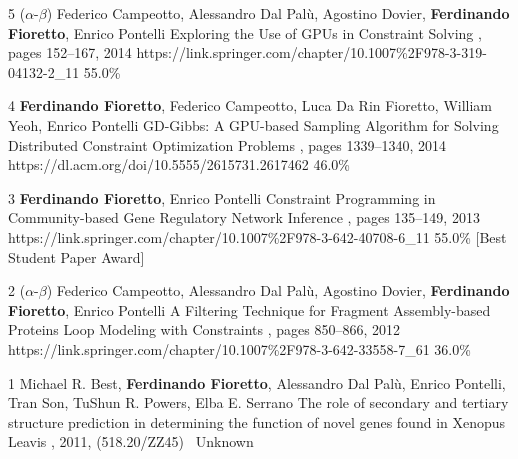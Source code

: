 \begin{pubs}
	\confentry
		{5} %
		{($\alpha$-$\beta$) 
		Federico Campeotto, Alessandro Dal Pal\`{u}, Agostino Dovier, {\bf Ferdinando Fioretto}, Enrico Pontelli}
		{Exploring the Use of GPUs in Constraint Solving}
		{\procPADL, pages 152--167, 2014}
		{https://link.springer.com/chapter/10.1007\%2F978-3-319-04132-2\_11}
		{55.0\%}

	\confentry 
		{4} %
		{{\bf Ferdinando Fioretto}, Federico Campeotto, Luca Da Rin Fioretto, William Yeoh, Enrico Pontelli} 
		{GD-Gibbs: A GPU-based Sampling Algorithm for Solving Distributed Constraint Optimization Problems} %
		{\procAAMAS, pages 1339--1340, 2014}
		{https://dl.acm.org/doi/10.5555/2615731.2617462}
		{46.0\%}

	\confentryAwd
		{3} %
		{{\bf Ferdinando Fioretto}, Enrico Pontelli} 
		{Constraint Programming in Community-based Gene Regulatory Network Inference} 
		{\procCMSB, pages 135--149, 2013}
		{https://link.springer.com/chapter/10.1007\%2F978-3-642-40708-6\_11}
		{55.0\%}
		{[Best Student Paper Award]}{}

	\confentry 
		{2} %
		{($\alpha$-$\beta$) 
		Federico Campeotto, Alessandro Dal Pal\`{u}, Agostino Dovier, {\bf Ferdinando Fioretto}, Enrico Pontelli}
		{A Filtering Technique for Fragment Assembly-based Proteins Loop Modeling with Constraints} 
		{\procCP, pages 850--866, 2012}
		{https://link.springer.com/chapter/10.1007\%2F978-3-642-33558-7\_61}
		{36.0\%}

	\confentry
		{1} %
		{Michael R. Best, {\bf Ferdinando Fioretto}, Alessandro Dal Pal\`{u}, Enrico Pontelli, Tran Son, TuShun R. Powers, Elba E. Serrano}
		{The role of secondary and tertiary structure prediction in determining the function of novel genes found in Xenopus Leavis}
		{, 2011, (518.20/ZZ45)}{~}
		{Unknown}
\end{pubs}


